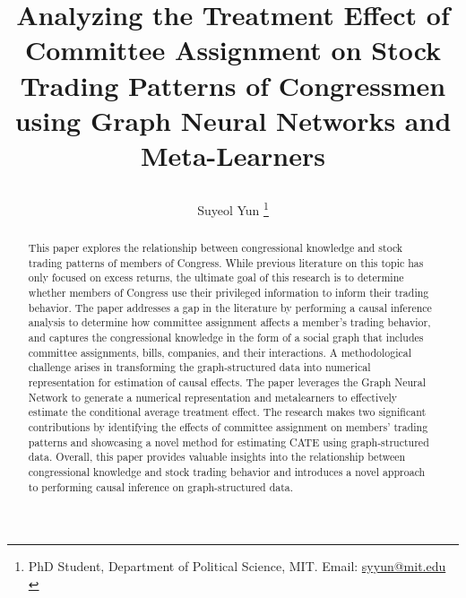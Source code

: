 \documentclass[15pt,letterpaper]{article}
\newcommand{\tit}{
\Large \bf
Analyzing the Treatment Effect of Committee Assignment on Stock Trading Patterns of Congressmen using Graph Neural Networks and Meta-Learners
}
\newcommand\spacingset[1]{\renewcommand{\baselinestretch}
{#1}\small\normalsize}
\begin{document}
\spacingset{1.25}

\setcounter{page}{0}
\vspace{-.1in}

{\title{
    \tit
  }
  \author{
    Suyeol Yun
  \thanks{PhD Student, Department of Political Science, MIT. Email: \href{mailto:syyun@mit.edu}{syyun@mit.edu}\\
  }
  }
  \maketitle
}

\thispagestyle{empty}
\vspace{-.1in}

\begin{abstract}
  This paper explores the relationship between congressional knowledge and stock trading patterns of members of Congress. While previous literature on this topic has only focused on excess returns, the ultimate goal of this research is to determine whether members of Congress use their privileged information to inform their trading behavior. The paper addresses a gap in the literature by performing a causal inference analysis to determine how committee assignment affects a member's trading behavior, and captures the congressional knowledge in the form of a social graph that includes committee assignments, bills, companies, and their interactions. A methodological challenge arises in transforming the graph-structured data into numerical representation for estimation of causal effects. The paper leverages the Graph Neural Network to generate a numerical representation and metalearners to effectively estimate the conditional average treatment effect. The research makes two significant contributions by identifying the effects of committee assignment on members' trading patterns and showcasing a novel method for estimating CATE using graph-structured data. 
  Overall, this paper provides valuable insights into the relationship between congressional knowledge and stock trading behavior and introduces a novel approach to performing causal inference on graph-structured data. 
\end{abstract}
\clearpage

\end{document}

